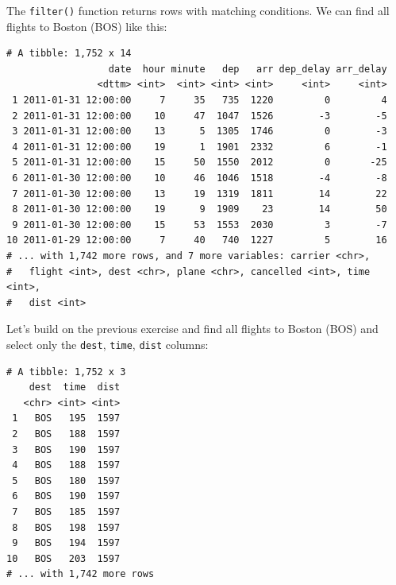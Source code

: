 \documentclass[]{article}
\newenvironment{Shaded}{\begin{snugshade}}{\end{snugshade}}
\newcommand{\KeywordTok}[1]{\textcolor[rgb]{0.13,0.29,0.53}{\textbf{{#1}}}}
\newcommand{\StringTok}[1]{\textcolor[rgb]{0.31,0.60,0.02}{{#1}}}
\newcommand{\NormalTok}[1]{{#1}}
\theoremstyle{definition}
\theoremstyle{definition}
\theoremstyle{definition}
\theoremstyle{remark}
\begin{document}
The \texttt{filter()} function returns rows with matching conditions. We
can find all flights to Boston (BOS) like this:

\begin{Shaded}
\end{Shaded}

\begin{verbatim}
# A tibble: 1,752 x 14
                  date  hour minute   dep   arr dep_delay arr_delay
                <dttm> <int>  <int> <int> <int>     <int>     <int>
 1 2011-01-31 12:00:00     7     35   735  1220         0         4
 2 2011-01-31 12:00:00    10     47  1047  1526        -3        -5
 3 2011-01-31 12:00:00    13      5  1305  1746         0        -3
 4 2011-01-31 12:00:00    19      1  1901  2332         6        -1
 5 2011-01-31 12:00:00    15     50  1550  2012         0       -25
 6 2011-01-30 12:00:00    10     46  1046  1518        -4        -8
 7 2011-01-30 12:00:00    13     19  1319  1811        14        22
 8 2011-01-30 12:00:00    19      9  1909    23        14        50
 9 2011-01-30 12:00:00    15     53  1553  2030         3        -7
10 2011-01-29 12:00:00     7     40   740  1227         5        16
# ... with 1,742 more rows, and 7 more variables: carrier <chr>,
#   flight <int>, dest <chr>, plane <chr>, cancelled <int>, time <int>,
#   dist <int>
\end{verbatim}

Let's build on the previous exercise and find all flights to Boston
(BOS) and select only the \texttt{dest}, \texttt{time}, \texttt{dist}
columns:

\begin{Shaded}
\end{Shaded}

\begin{verbatim}
# A tibble: 1,752 x 3
    dest  time  dist
   <chr> <int> <int>
 1   BOS   195  1597
 2   BOS   188  1597
 3   BOS   190  1597
 4   BOS   188  1597
 5   BOS   180  1597
 6   BOS   190  1597
 7   BOS   185  1597
 8   BOS   198  1597
 9   BOS   194  1597
10   BOS   203  1597
# ... with 1,742 more rows
\end{verbatim}
\end{document}
